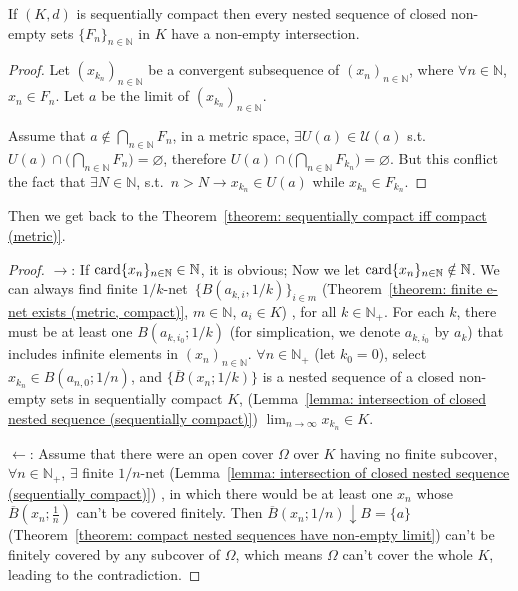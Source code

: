 \documentclass[openany]{book}
\begin{document}
\begin{lemma}\label{lemma: intersection of closed nested sequence (sequentially compact)}
	If $(K, d)$ is sequentially compact then every nested sequence of closed non-empty sets $\{F_n\}_{n \in \mathbb N}$ in $K$ have a non-empty intersection.
\end{lemma}
\begin{proof}
	Let $(x_{k_n})_{n \in \mathbb N}$ be a convergent subsequence of $(x_n)_{n \in \mathbb N}$, where $\forall n \in \mathbb N$, $x_n \in F_n$. 
	Let $a$ be the limit of $(x_{k_n})_{n \in \mathbb N}$. 

	Assume that $a \notin \bigcap_{n \in \mathbb N} F_n$, in a metric space, $\exists U(a) \in \mathscr U(a)$ s.t.\ $U(a) \cap \big(\bigcap_{n \in \mathbb N} F_n \big) = \varnothing$, therefore $U(a) \cap \big(\bigcap_{n \in \mathbb N} F_{k_n} \big)=\varnothing$. 
	But this conflict the fact that $\exists N \in \mathbb N$, s.t.\ $n > N \to x_{k_n}\in U(a)$ while $x_{k_n} \in F_{k_n}$.
\end{proof}

Then we get back to the Theorem~\ref{theorem: sequentially compact iff compact (metric)}. 
\begin{proof}

	$\to$: 
	If $\operatorname{card} \{x_n\}_{n \in \mathbb N} \in \mathbb N$, it is obvious; 
	Now we let $\operatorname{card} \{x_n\}_{n \in \mathbb N} \notin \mathbb N$. 
	We can always find finite $1/k$-net~$\{B(a_{k, i}, 1/k)\}_{i \in m}$
		(Theorem~\ref{theorem: finite e-net exists (metric, compact)}, 
			$m \in \mathbb N$, $a_i \in K$)%
	, for all $k \in \mathbb N_+$. 
	For each $k$, there must be at least one $B(a_{k, i_0}; 1/k)$
		(for simplication, we denote $a_{k, i_0}$ by $a_k$)
	that includes infinite elements in $(x_n)_{n \in \mathbb N}$. 
	$\forall n \in \mathbb N_+$
		(let $k_0 = 0$), 
	select $x_{k_n} \in B(a_{n, 0}; 1/n)$, and $\{\overline B(x_n; 1/k)\}$ is a nested sequence of a closed non-empty sets in sequentially compact $K$,
		(Lemma~\ref{lemma: intersection of closed nested sequence (sequentially compact)})
	$\lim_{n\to \infty} x_{k_n} \in K$.
	
	$\gets$: 
	Assume that there were an open cover $\varOmega$ over $K$ having no finite subcover, $\forall n \in \mathbb N_+$, $\exists$ finite $1/n$-net 
		(Lemma~\ref{lemma: intersection of closed nested sequence (sequentially compact)})%
	, in which there would be at least one $x_n$ whose $\overline B(x_n;\frac{1}{n})$ can't be covered finitely. 
	Then $\overline B(x_n; 1/n) \downarrow B = \{a\}$ 
		(Theorem~\ref{theorem: compact nested sequences have non-empty limit})
	can't be finitely covered by any subcover of $\varOmega$, 
	which means $\varOmega$ can't cover the whole $K$, leading to the contradiction.
\end{proof}
\end{document}
